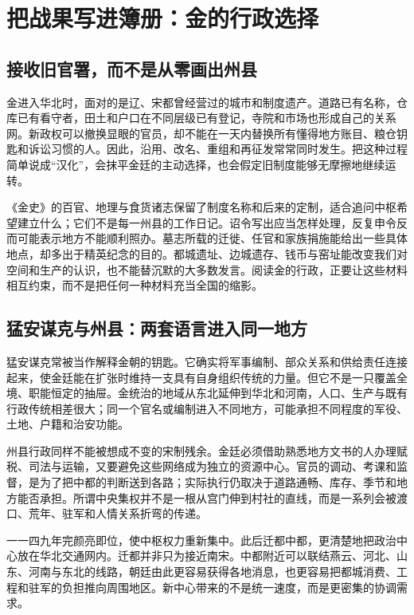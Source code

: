 \section{把战果写进簿册：金的行政选择}

\subsection{接收旧官署，而不是从零画出州县}

金进入华北时，面对的是辽、宋都曾经营过的城市和制度遗产。道路已有名称，仓库已有看守者，田土和户口在不同层级已有登记，寺院和市场也形成自己的关系网。新政权可以撤换显眼的官员，却不能在一天内替换所有懂得地方账目、粮仓钥匙和诉讼习惯的人。因此，沿用、改名、重组和再征发常常同时发生。把这种过程简单说成“汉化”，会抹平金廷的主动选择，也会假定旧制度能够无摩擦地继续运转。

《金史》的百官、地理与食货诸志保留了制度名称和后来的定制，适合追问中枢希望建立什么；它们不是每一州县的工作日记。诏令写出应当怎样处理，反复申令反而可能表示地方不能顺利照办。墓志所载的迁徙、任官和家族捐施能给出一些具体地点，却多出于精英纪念的目的。都城遗址、边城遗存、钱币与窑址能改变我们对空间和生产的认识，也不能替沉默的大多数发言。阅读金的行政，正要让这些材料相互约束，而不是把任何一种材料充当全国的缩影。

\subsection{猛安谋克与州县：两套语言进入同一地方}

猛安谋克常被当作解释金朝的钥匙。它确实将军事编制、部众关系和供给责任连接起来，使金廷能在扩张时维持一支具有自身组织传统的力量。但它不是一只覆盖全境、职能恒定的抽屉。金统治的地域从东北延伸到华北和河南，人口、生产与既有行政传统相差很大；同一个官名或编制进入不同地方，可能承担不同程度的军役、土地、户籍和治安功能。

州县行政同样不能被想成不变的宋制残余。金廷必须借助熟悉地方文书的人办理赋税、司法与运输，又要避免这些网络成为独立的资源中心。官员的调动、考课和监督，是为了把中都的判断送到各路；实际执行仍取决于道路通畅、库存、季节和地方能否承担。所谓中央集权并不是一根从宫门伸到村社的直线，而是一系列会被渡口、荒年、驻军和人情关系折弯的传递。

一一四九年完颜亮即位，使中枢权力重新集中。此后迁都中都，更清楚地把政治中心放在华北交通网内。迁都并非只为接近南宋。中都附近可以联结燕云、河北、山东、河南与东北的线路，朝廷由此更容易获得各地消息，也更容易把都城消费、工程和驻军的负担推向周围地区。新中心带来的不是统一速度，而是更密集的协调需求。

